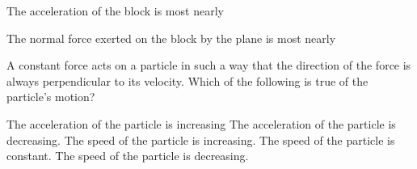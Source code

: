 \documentclass{../../oss-apphys-exam}
\begin{document}
\begin{multicols*}{2}
\begin{questions}
    
    \question The acceleration of the block is most nearly
    \label{plane1}
    
    \question The normal force exerted on the block by the plane is most nearly
    \label{plane2}
   
    \question A constant force acts on a particle in such a way that the
    direction of the force is always perpendicular to its velocity. Which of the
    following is true of the particle's motion?
    \begin{choices}
      \choice The acceleration of the particle is increasing
      \choice The acceleration of the particle is decreasing.
      \choice The speed of the particle is increasing.
      \choice The speed of the particle is constant.
      \choice The speed of the particle is decreasing.
    \end{choices}
    \vspace{.7in}


\end{questions}
\end{multicols*}
\end{document}
